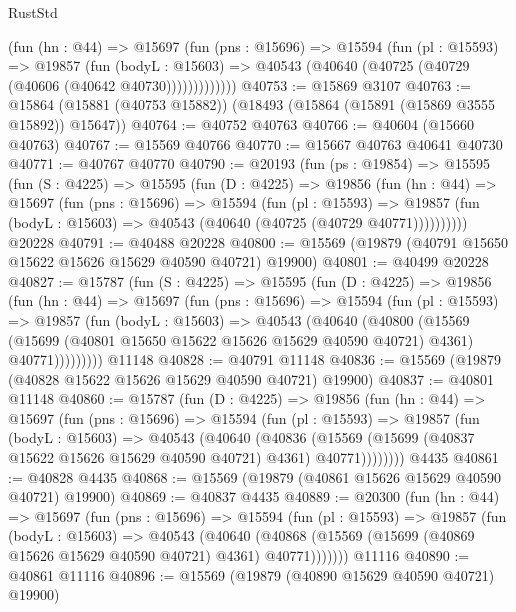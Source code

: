 \begin{lexlean}{RustStd}
\begin{coremodule}
            (fun (hn : @44) =>
            @15697
              (fun (pns : @15696) =>
              @15594
                (fun (pl : @15593) =>
                @19857
                  (fun (bodyL : @15603) =>
                  @40543 (@40640 (@40725 (@40729 (@40606 (@40642 @40730)))))))))))))
@40753 := @15869 @3107
@40763 := @15864 (@15881 (@40753 @15882)) (@18493 (@15864 (@15891 (@15869 @3555 @15892)) @15647))
@40764 := @40752 @40763
@40766 := @40604 (@15660 @40763)
@40767 := @15569 @40766
@40770 := @15667 @40763 @40641 @40730
@40771 := @40767 @40770
@40790 := @20193
    (fun (ps : @19854) =>
    @15595
      (fun (S : @4225) =>
      @15595
        (fun (D : @4225) =>
        @19856
          (fun (hn : @44) =>
          @15697
            (fun (pns : @15696) =>
            @15594
              (fun (pl : @15593) =>
              @19857 (fun (bodyL : @15603) => @40543 (@40640 (@40725 (@40729 @40771))))))))))
    @20228
@40791 := @40488 @20228
@40800 := @15569 (@19879 (@40791 @15650 @15622 @15626 @15629 @40590 @40721) @19900)
@40801 := @40499 @20228
@40827 := @15787
    (fun (S : @4225) =>
    @15595
      (fun (D : @4225) =>
      @19856
        (fun (hn : @44) =>
        @15697
          (fun (pns : @15696) =>
          @15594
            (fun (pl : @15593) =>
            @19857
              (fun (bodyL : @15603) =>
              @40543
                (@40640
                  (@40800
                    (@15569
                      (@15699 (@40801 @15650 @15622 @15626 @15629 @40590 @40721) @4361)
                      @40771)))))))))
    @11148
@40828 := @40791 @11148
@40836 := @15569 (@19879 (@40828 @15622 @15626 @15629 @40590 @40721) @19900)
@40837 := @40801 @11148
@40860 := @15787
    (fun (D : @4225) =>
    @19856
      (fun (hn : @44) =>
      @15697
        (fun (pns : @15696) =>
        @15594
          (fun (pl : @15593) =>
          @19857
            (fun (bodyL : @15603) =>
            @40543
              (@40640
                (@40836
                  (@15569 (@15699 (@40837 @15622 @15626 @15629 @40590 @40721) @4361) @40771))))))))
    @4435
@40861 := @40828 @4435
@40868 := @15569 (@19879 (@40861 @15626 @15629 @40590 @40721) @19900)
@40869 := @40837 @4435
@40889 := @20300
    (fun (hn : @44) =>
    @15697
      (fun (pns : @15696) =>
      @15594
        (fun (pl : @15593) =>
        @19857
          (fun (bodyL : @15603) =>
          @40543
            (@40640
              (@40868 (@15569 (@15699 (@40869 @15626 @15629 @40590 @40721) @4361) @40771)))))))
    @11116
@40890 := @40861 @11116
@40896 := @15569 (@19879 (@40890 @15629 @40590 @40721) @19900)

\end{coremodule}
\end{lexlean}
